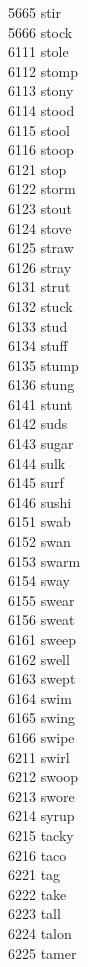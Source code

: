 5665 stir \\
5666 stock \\
6111 stole \\
6112 stomp \\
6113 stony \\
6114 stood \\
6115 stool \\
6116 stoop \\
6121 stop \\
6122 storm \\
6123 stout \\
6124 stove \\
6125 straw \\
6126 stray \\
6131 strut \\
6132 stuck \\
6133 stud \\
6134 stuff \\
6135 stump \\
6136 stung \\
6141 stunt \\
6142 suds \\
6143 sugar \\
6144 sulk \\
6145 surf \\
6146 sushi \\
6151 swab \\
6152 swan \\
6153 swarm \\
6154 sway \\
6155 swear \\
6156 sweat \\
6161 sweep \\
6162 swell \\
6163 swept \\
6164 swim \\
6165 swing \\
6166 swipe \\
6211 swirl \\
6212 swoop \\
6213 swore \\
6214 syrup \\
6215 tacky \\
6216 taco \\
6221 tag \\
6222 take \\
6223 tall \\
6224 talon \\
6225 tamer \\
